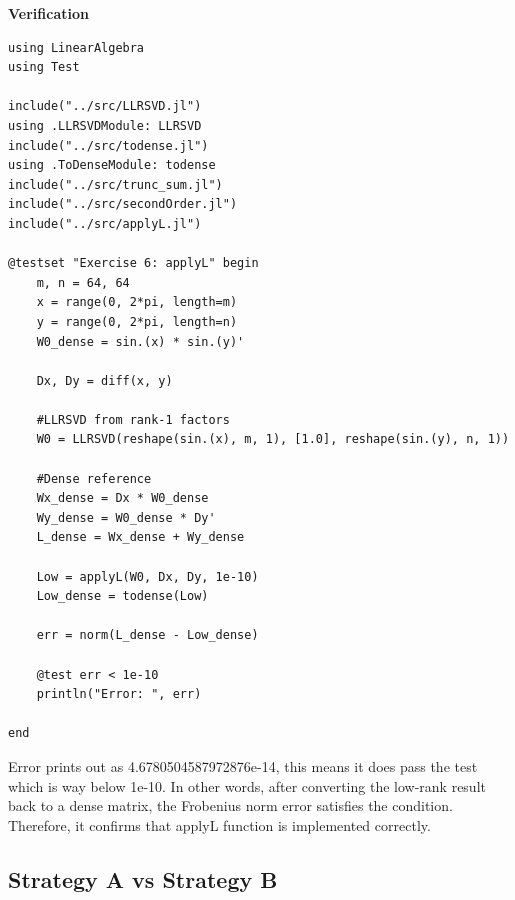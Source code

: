 \documentclass[11pt]{report}
\begin{document}
\textbf{Verification}

\begin{lstlisting}
using LinearAlgebra
using Test

include("../src/LLRSVD.jl")
using .LLRSVDModule: LLRSVD
include("../src/todense.jl")
using .ToDenseModule: todense
include("../src/trunc_sum.jl")
include("../src/secondOrder.jl")
include("../src/applyL.jl")

@testset "Exercise 6: applyL" begin
    m, n = 64, 64
    x = range(0, 2*pi, length=m)
    y = range(0, 2*pi, length=n)
    W0_dense = sin.(x) * sin.(y)'

    Dx, Dy = diff(x, y)

    #LLRSVD from rank-1 factors
    W0 = LLRSVD(reshape(sin.(x), m, 1), [1.0], reshape(sin.(y), n, 1))

    #Dense reference
    Wx_dense = Dx * W0_dense
    Wy_dense = W0_dense * Dy'
    L_dense = Wx_dense + Wy_dense

    Low = applyL(W0, Dx, Dy, 1e-10)
    Low_dense = todense(Low)

    err = norm(L_dense - Low_dense)

    @test err < 1e-10
    println("Error: ", err)

end
\end{lstlisting}

Error prints out as 4.6780504587972876e-14, this means it does pass the test which is way below 1e-10. In other words, after converting the low-rank result back to a dense matrix, the Frobenius norm error satisfies the condition. Therefore, it confirms that applyL function is implemented correctly.

\subsection{Strategy A vs Strategy B}
\end{document}
